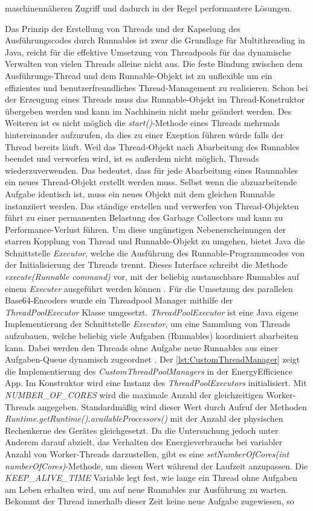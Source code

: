 maschinennäheren Zugriff und dadurch in der Regel performantere Lösungen.

Das Prinzip der Erstellung von Threads und der Kapselung des Ausführungscodes durch Runnables ist zwar die Grundlage für Multithreading in Java, reicht für die effektive Umsetzung von Threadpools für das dynamische Verwalten von vielen Threads alleine nicht aus. Die feste Bindung zwischen dem Ausführungs-Thread und dem Runnable-Objekt ist zu unflexible um ein effizientes und benutzerfreundliches Thread-Management zu realisieren. Schon bei der Erzeugung eines Threads muss das Runnable-Objekt im Thread-Konstruktor übergeben werden und kann im Nachhinein nicht mehr geändert werden. Des Weiteren ist es nicht möglich die \emph{start()}-Methode eines Threads mehrmals hintereinander aufzurufen, da dies zu einer Exeption führen würde falls der Thread bereits läuft. Weil das Thread-Objekt nach Abarbeitung des Runnables beendet und verworfen wird, ist es außerdem nicht möglich, Threads wiederzuverwenden. Das bedeutet, dass für jede Abarbeitung eines Raunnables ein neues Thread-Objekt erstellt werden muss. Selbst wenn die abzuarbeitende Aufgabe identisch ist, muss ein neues Objekt mit dem gleichen Runnable instanziiert werden. Das ständige erstellen und verwerfen von Thread-Objekten führt zu einer permanenten Belastung des Garbage Collectors und kann zu Performance-Verlust führen. Um diese ungünstigen Nebenerscheinungen der starren Kopplung von Thread und Runnable-Objekt zu umgehen, bietet Java die Schnittstelle \emph{Executor}, welche die Ausführung des Runnable-Programmcodes von der Initialisierung der Threads trennt. Dieses Interface schreibt die Methode \emph{execute(Runnable command)} vor,  mit der beliebig austauschbare Runnables auf einem \emph{Executer} ausgeführt werden können \cite{javaInselExecutor}. Für die Umsetzung des parallelen Base64-Encoders wurde ein Threadpool Manager mithilfe der \emph{ThreadPoolExecutor} Klasse umgesetzt. \emph{ThreadPoolExecutor} ist eine Java eigene Implementierung der Schnittstelle \emph{Executor}, um eine Sammlung von Threads aufzubauen, welche beliebig viele Aufgaben (Runnables) koordiniert abarbeiten kann. Dabei werden den Threads ohne Aufgabe neue Runnables aus einer Aufgaben-Queue dynamisch zugeordnet \cite{javaInselExecutor}. Der \autoref{lst:CustomThreadManager} zeigt die Implementierung des \emph{ CustomThreadPoolManagers} in der \glqq EnergyEfficience\grqq{} App. Im Konstruktor wird eine Instanz des \emph{ThreadPoolExecutors} initialisiert. Mit \emph{NUMBER\_OF\_CORES} wird die maximale Anzahl der gleichzeitigen Worker-Threads angegeben. Standardmäßig wird dieser Wert durch Aufruf der Methoden \emph{Runtime.getRuntime().availableProcessors()} mit der Anzahl der physischen Rechenkerne des Gerätes gleichgesetzt. Da die Untersuchung jedoch unter Anderem darauf abzielt, das Verhalten des Energieverbrauchs bei variabler Anzahl von Worker-Threads darzustellen, gibt es eine  \emph{ setNumberOfCores(int numberOfCores)}-Methode, um  diesen Wert während der Laufzeit anzupassen. Die \emph{ KEEP\_ALIVE\_TIME} Variable legt fest, wie lange ein Thread ohne Aufgaben am Leben erhalten wird, um auf neue Runnables zur Ausführung zu warten. Bekommt der Thread innerhalb dieser Zeit keine neue Aufgabe zugewiesen, so 